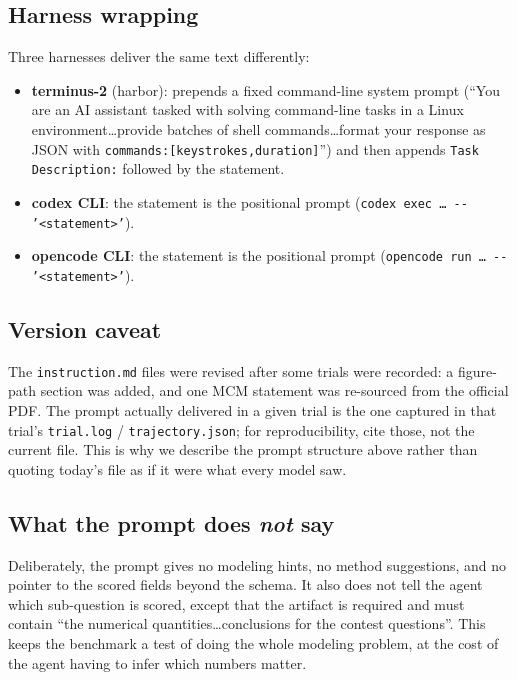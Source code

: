 \subsection{Harness wrapping}
Three harnesses deliver the same text differently:
\begin{itemize}[leftmargin=1.4em,itemsep=1pt]
\item \textbf{terminus-2} (harbor): prepends a fixed command-line system prompt
(``You are an AI assistant tasked with solving command-line tasks in a Linux
environment\ldots provide batches of shell commands\ldots format your response as
JSON with \texttt{commands:[{keystrokes,duration}]}'') and then appends
\texttt{Task Description:} followed by the statement.
\item \textbf{codex CLI}: the statement is the positional prompt
(\texttt{codex exec \ldots\ -{}- '<statement>'}).
\item \textbf{opencode CLI}: the statement is the positional prompt
(\texttt{opencode run \ldots\ -{}- '<statement>'}).
\end{itemize}

\subsection{Version caveat}
The \texttt{instruction.md} files were revised after some trials were recorded:
a figure-path section was added, and one MCM statement was re-sourced from the
official PDF. The prompt actually delivered in a given trial is the one captured
in that trial's \texttt{trial.log} / \texttt{trajectory.json}; for
reproducibility, cite those, not the current file. This is why we describe the
prompt structure above rather than quoting today's file as if it were what every
model saw.

\subsection{What the prompt does \emph{not} say}
Deliberately, the prompt gives no modeling hints, no method suggestions, and no
pointer to the scored fields beyond the schema. It also does not tell the agent
which sub-question is scored, except that the artifact is required and must
contain ``the numerical quantities\ldots conclusions for the contest questions''.
This keeps the benchmark a test of doing the whole modeling problem, at the cost
of the agent having to infer which numbers matter.
